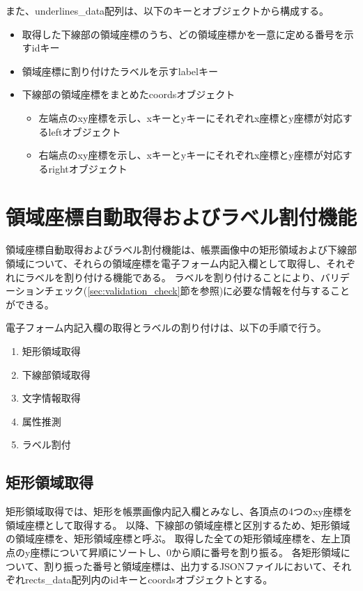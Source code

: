 また、underlines\_data配列は、以下のキーとオブジェクトから構成する。

\begin{itemize}
    \item 取得した下線部の領域座標のうち、どの領域座標かを一意に定める番号を示すidキー
    \item 領域座標に割り付けたラベルを示すlabelキー
    \item 下線部の領域座標をまとめたcoordsオブジェクト
    \begin{itemize}
        \item 左端点のxy座標を示し、xキーとyキーにそれぞれx座標とy座標が対応するleftオブジェクト
        \item 右端点のxy座標を示し、xキーとyキーにそれぞれx座標とy座標が対応するrightオブジェクト
    \end{itemize}
\end{itemize}

\section{領域座標自動取得およびラベル割付機能}\label{sec:eform_write_space_obtainment_feature}
領域座標自動取得およびラベル割付機能は、帳票画像中の矩形領域および下線部領域について、それらの領域座標を電子フォーム内記入欄として取得し、それぞれにラベルを割り付ける機能である。
ラベルを割り付けることにより、バリデーションチェック(\ref{sec:validation_check}節を参照)に必要な情報を付与することができる。

電子フォーム内記入欄の取得とラベルの割り付けは、以下の手順で行う。

\begin{enumerate}
    \item 矩形領域取得
    \item 下線部領域取得
    \item 文字情報取得
    \item 属性推測
    \item ラベル割付
\end{enumerate}

\subsection{矩形領域取得}\label{subsec:rect_coords_obtainment}
矩形領域取得では、矩形を帳票画像内記入欄とみなし、各頂点の4つのxy座標を領域座標として取得する。
以降、下線部の領域座標と区別するため、矩形領域の領域座標を、矩形領域座標と呼ぶ。
取得した全ての矩形領域座標を、左上頂点のy座標について昇順にソートし、0から順に番号を割り振る。
各矩形領域について、割り振った番号と領域座標は、出力するJSONファイルにおいて、それぞれrects\_data配列内のidキーとcoordsオブジェクトとする。

